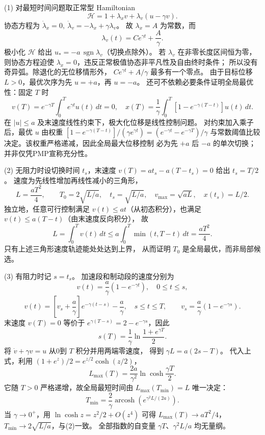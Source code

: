 (1) 对最短时间问题取正常型 Hamiltonian
\[
 \mathcal H=1+\lambda_x v+\lambda_v(u-\gamma v).
\]
协态方程为
\(\dot\lambda_x=0,\ \dot\lambda_v=-\lambda_x+\gamma\lambda_v\)。
故 \(\lambda_x=A\) 为常数，而
\[
 \lambda_v(t)=C e^{\gamma t}+\frac{A}{\gamma}.
\]
极小化 \(\mathcal H\) 给出 \(u_*=-a\,\operatorname{sgn}\lambda_v\)（切换点除外）。
若 \(\lambda_v\) 在非零长度区间恒为零，则协态方程迫使
\(\lambda_x=0\)，违反正常极值协态非平凡性及自由终时条件；
所以没有奇异弧。除退化的无位移情形外，
\(C e^{\gamma t}+A/\gamma\) 最多有一个零点。
由于目标位移 \(L>0\)，最优次序为先 \(u=+a\)，再 \(u=-a\)。
还可不依赖必要条件证明全局最优性：固定 \(T\) 时
\[
 v(T)=e^{-\gamma T}\int_0^T e^{\gamma t}u(t)\,dt=0,\quad
 x(T)=\frac1\gamma\int_0^T[1-e^{-\gamma(T-t)}]u(t)\,dt.
\]
在 \(|u|\le a\) 及末速度线性约束下，极大化位移是线性控制问题。
对约束加入乘子后，最优 \(u\) 由权重
\([1-e^{-\gamma(T-t)}]/(\gamma e^{\gamma t})
 =(e^{-\gamma t}-e^{-\gamma T})/\gamma\)
与常数阈值比较决定。该权重严格递减，因此全局最大位移控制
必为先 \(+a\) 后 \(-a\) 的单次切换；并非仅凭PMP宣称充分性。

(2) 无阻力时设切换时间 \(t_s\)，末速度
\(v(T)=a t_s-a(T-t_s)=0\) 给出 \(t_s=T/2\)。
速度为先线性增加再线性减小的三角形，
\[
 L=\frac{aT^2}{4},\qquad
 \boxed{T_0=2\sqrt{L/a}},\quad
 \boxed{t_s=\sqrt{L/a}},\quad
 \boxed{v_{\max}=\sqrt{aL}},\quad
 \boxed{x(t_s)=L/2}.
\]
独立地，任意可行控制满足
\(v(t)\le at\)（从初态积分），也满足
\(v(t)\le a(T-t)\)（由末速度反向积分），
故
\[
 L=\int_0^T v(t)\,dt
 \le a\int_0^T\min(t,T-t)\,dt
 =\frac{aT^2}{4}.
\]
只有上述三角形速度轨迹能处处达到上界，
从而证明 \(T_0\) 是全局最优，而非局部候选。

(3) 有阻力时记 \(s=t_s\)。
加速段和制动段的速度分别为
\[
 v(t)=\frac a\gamma(1-e^{-\gamma t}),\quad0\le t\le s,
\]
\[
 v(t)=\left[v_s+\frac a\gamma\right]e^{-\gamma(t-s)}
       -\frac a\gamma,\quad s\le t\le T,\qquad
 v_s=\frac a\gamma(1-e^{-\gamma s}).
\]
末速度 \(v(T)=0\) 等价于
\(e^{\gamma(T-s)}=2-e^{-\gamma s}\)，因此
\[
 \boxed{s(T)=\frac1\gamma
 \ln\frac{1+e^{\gamma T}}2}.
\]
将 \(\dot v+\gamma v=u\) 从0到 \(T\) 积分并用两端零速度，
得到 \(\gamma L=a(2s-T)\)。
代入上式，利用
\((1+e^z)/2=e^{z/2}\cosh(z/2)\)，
\[
 \boxed{L_{\max}(T)=\frac{2a}{\gamma^2}
 \ln\cosh\frac{\gamma T}{2}}.
\]
它随 \(T>0\) 严格递增，故全局最短时间由
\(L_{\max}(T_{\min})=L\) 唯一决定：
\[
 \boxed{T_{\min}=\frac2\gamma
 \operatorname{arcosh}\!\left(e^{\gamma^2L/(2a)}\right)}.
\]
当 \(\gamma\to0^+\)，用
\(\ln\cosh z=z^2/2+O(z^4)\)
可得 \(L_{\max}(T)\to aT^2/4\)，
\(T_{\min}\to2\sqrt{L/a}\)，与(2)一致。
全部指数的自变量 \(\gamma T\)、\(\gamma^2L/a\) 均无量纲。

